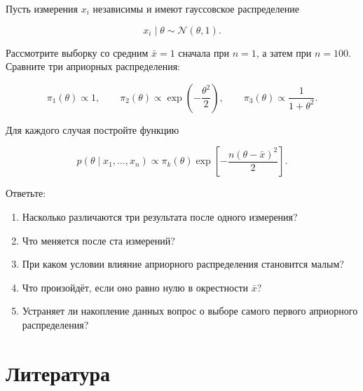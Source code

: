 \documentclass[
  russian,
  11pt,
  a4paper,
  open=any]{scrbook}
\providecommand{\tightlist}{%
  \setlength{\itemsep}{0pt}\setlength{\parskip}{0pt}}
\begin{document}
\begin{semanticpdfbox}[colback=BookCoralSoft,borderline west={1.2mm}{0pt}{BookCoral}]

\par\nopagebreak[4]\vspace{1.2mm}

Пусть измерения \(x_i\) независимы и имеют гауссовское распределение

\[
x_i\mid\theta\sim\mathcal N(\theta,1).
\]

Рассмотрите выборку со средним \(\bar x=1\) сначала при \(n=1\), а затем
при \(n=100\). Сравните три априорных распределения:

\[
\pi_1(\theta)\propto 1,
\qquad
\pi_2(\theta)\propto \exp\!\left(-\frac{\theta^2}{2}\right),
\qquad
\pi_3(\theta)\propto \frac{1}{1+\theta^2}.
\]

Для каждого случая постройте функцию

\[
p(\theta\mid x_1,\ldots,x_n)
\propto
\pi_k(\theta)
\exp\!\left[-\frac{n(\theta-\bar x)^2}{2}\right].
\]

Ответьте:

\begin{enumerate}
\def\labelenumi{\arabic{enumi}.}
\tightlist
\item
  Насколько различаются три результата после одного измерения?
\item
  Что меняется после ста измерений?
\item
  При каком условии влияние априорного распределения становится малым?
\item
  Что произойдёт, если оно равно нулю в окрестности \(\bar x\)?
\item
  Устраняет ли накопление данных вопрос о выборе самого первого
  априорного распределения?
\end{enumerate}

\end{semanticpdfbox}

\section*{Литература}\label{ux43bux438ux442ux435ux440ux430ux442ux443ux440ux430}

\end{document}

